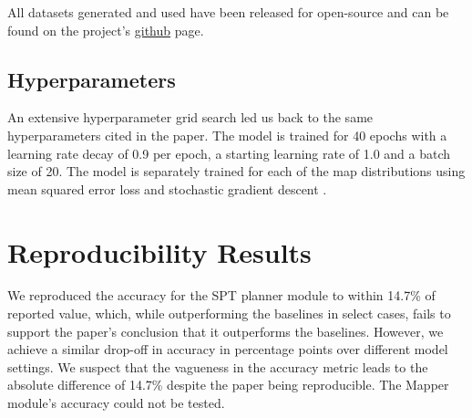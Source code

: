 All datasets generated and used have been released for open-source and can be found on the project's \href{https://anonymous.4open.science/r/Differentiable-Spatial-Planning-using-Transformers-7107}{github} page.

\subsection{Hyperparameters}
An extensive hyperparameter grid search led us back to the same hyperparameters cited in the paper. The model is trained for 40 epochs with a learning rate decay of 0.9 per epoch, a starting learning rate of 1.0 and a batch size of 20. The model is separately trained for each of the map distributions using mean squared error loss and stochastic gradient descent \cite{ketkar2017stochastic}.

\section{Reproducibility Results}
\label{sec:repo results}
We reproduced the accuracy for the SPT planner module to within 14.7\% of reported value, which, while outperforming the baselines \cite{lee2018gated} \cite{tamar2016value} in select cases, fails to support the paper's conclusion that it outperforms the baselines. However, we achieve a similar drop-off in accuracy in percentage points over different model settings. We suspect that the vagueness in the accuracy metric leads to the absolute difference of 14.7\% despite the paper being reproducible. The Mapper module's accuracy could not be tested.

